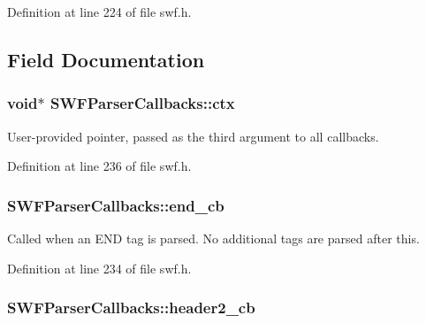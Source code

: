Definition at line 224 of file swf.\+h.



\subsection{Field Documentation}
\hypertarget{struct_s_w_f_parser_callbacks_a580259560295835647b2ac312addaf9c}{}
\subsubsection[{ctx}]{\setlength{\rightskip}{0pt plus 5cm}void$\ast$ S\+W\+F\+Parser\+Callbacks\+::ctx}\label{struct_s_w_f_parser_callbacks_a580259560295835647b2ac312addaf9c}
User-\/provided pointer, passed as the third argument to all callbacks. 

Definition at line 236 of file swf.\+h.

\hypertarget{struct_s_w_f_parser_callbacks_a31cb75f39add22bb824685d6d7ba07a1}{}
\subsubsection[{end\+\_\+cb}]{ S\+W\+F\+Parser\+Callbacks\+::end\+\_\+cb}\label{struct_s_w_f_parser_callbacks_a31cb75f39add22bb824685d6d7ba07a1}
Called when an E\+N\+D tag is parsed. No additional tags are parsed after this. 

Definition at line 234 of file swf.\+h.

\hypertarget{struct_s_w_f_parser_callbacks_a21beaa520990137cfe64ee20d5eb6054}{}
\subsubsection[{header2\+\_\+cb}]{ S\+W\+F\+Parser\+Callbacks\+::header2\+\_\+cb}\label{struct_s_w_f_parser_callbacks_a21beaa520990137cfe64ee20d5eb6054}


